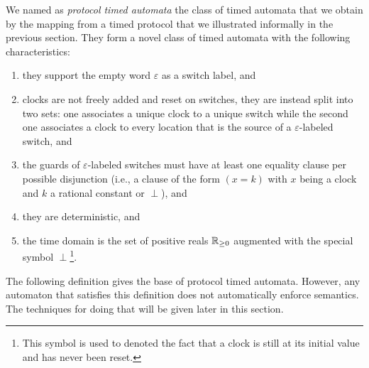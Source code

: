 We named as \emph{protocol timed automata} the class of timed automata \cite{RADLD94} that we obtain by the mapping from a timed protocol that we illustrated informally in the previous section. They form a novel class of timed automata with the following characteristics:
\begin{enumerate}
  
  \item they support the empty word $\varepsilon$ as a switch label, and
  
  \item clocks are not freely added and reset on switches, they are instead split into two sets: one associates a unique clock to a unique switch while the second one associates a clock to every location that is the source of a $\varepsilon$-labeled switch, and
  
  \item the guards of $\varepsilon$-labeled switches must have at least one equality clause per possible disjunction (i.e., a clause of the form $(x = k)$ with $x$ being a clock and $k$ a rational constant or $\perp$), and
  
  \item they are deterministic, and
  
  \item the time domain is the set of positive reals $\mathbb{R}_{\geq 0}$ augmented with the special symbol $\perp$\footnote{This symbol is used to denoted the fact that a clock is still at its initial value and has never been reset.}.
  
\end{enumerate}

The following definition gives the base of protocol timed automata. However, any automaton that satisfies this definition does not automatically enforce \MInvoke semantics. The techniques for doing that will be given later in this section.

